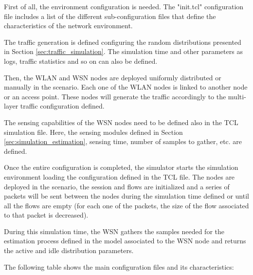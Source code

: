 First of all, the environment configuration is needed. The "init.tcl" configuration file includes a list of the different sub-configuration files that define the characteristics of the network environment.

The traffic generation is defined configuring the random distributions presented in Section \ref{sec:traffic_simulation}. The simulation time and other parameters as logs, traffic statistics and so on can also be defined.

Then, the \acs{WLAN} and \acs{WSN} nodes are deployed uniformly distributed or manually in the scenario. Each one of the \acs{WLAN} nodes is linked to another node or an access point. These nodes will generate the traffic accordingly to the multi-layer traffic configuration defined.

The sensing capabilities of the \acs{WSN} nodes need to be defined also in the TCL simulation file. Here, the sensing modules defined in Section \ref{sec:simulation_estimation}, sensing time, number of samples to gather, etc. are defined.

Once the entire configuration is completed, the simulator starts the simulation environment loading the configuration defined in the TCL file. The nodes are deployed in the scenario, the session and flows are initialized and a series of packets will be sent between the nodes during the simulation time defined or until all the flows are empty (for each one of the packets, the size of the flow associated to that packet is decreased).

During this simulation time, the \acs{WSN} gathers the samples needed for the estimation process defined in the model associated to the \acs{WSN} node and returns the active and idle distribution parameters.

The following table shows the main configuration files and its characteristics:

